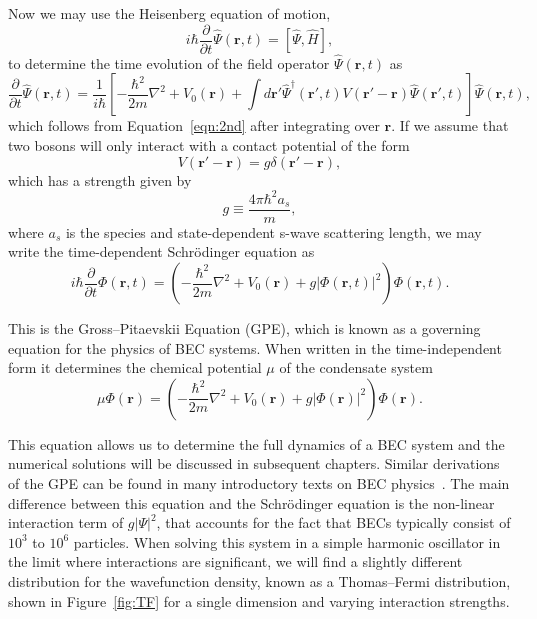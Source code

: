 Now we may use the Heisenberg equation of motion,
\begin{equation}
    i\hbar \frac{\partial}{\partial t}\hat \Psi(\mathbf{r},t) = [\hat \Psi, \hat H],
\end{equation}
    to determine the time evolution of the field operator $\hat \Psi(\mathbf{r},t)$ as
\begin{equation}
    \frac{\partial}{\partial t}\hat \Psi(\mathbf{r},t) = \frac{1}{i\hbar}\left[-\frac{\hbar^2}{2m}\nabla^2 + V_0(\mathbf{r}) + \int d\mathbf{r'} \hat \Psi^\dagger(\mathbf{r'}, t)V(\mathbf{r'} -\mathbf{r})\hat \Psi(\mathbf{r'},t)\right]\hat \Psi(\mathbf{r},t),
\end{equation}
which follows from Equation~\eqref{eqn:2nd} after integrating over $\mathbf{r}$.
If we assume that two bosons will only interact with a contact potential of the form
\begin{equation}
V(\mathbf{r'}-\mathbf{r}) = g\delta(\mathbf{r'} - \mathbf{r}),
\end{equation}
which has a strength given by
\begin{equation}
g \equiv \frac{4 \pi \hbar^2 a_s}{m},
\end{equation}
where $a_s$ is the species and state-dependent s-wave scattering length,
we may write the time-dependent Schr\"odinger equation as
\begin{equation}
    i\hbar \frac{\partial}{\partial t}\Phi(\mathbf{r},t) = \left( - \frac{\hbar^2}{2m} \nabla^2 + V_0(\mathbf{r}) + g |\Phi(\mathbf{r},t)|^2\right)\Phi(\mathbf{r},t).
\end{equation}

\noindent This is the Gross--Pitaevskii Equation (GPE), which is known as a governing equation for the physics of BEC systems.
When written in the time-independent form it determines the chemical potential $\mu$ of the condensate system~\cite{gross1961, pitaevskii1961}
\begin{equation}
    \mu\Phi(\mathbf{r}) = \left( - \frac{\hbar^2}{2m} \nabla^2 + V_0(\mathbf{r}) + g |\Phi(\mathbf{r})|^2\right)\Phi(\mathbf{r}).
    \label{eqn:GP}
\end{equation}

\noindent This equation allows us to determine the full dynamics of a BEC system and the numerical solutions will be discussed in subsequent chapters.
Similar derivations of the GPE can be found in many introductory texts on BEC physics~\cite{fetter2003, pethick2002, fetter2009}.
The main difference between this equation and the Schr\"odinger equation is the non-linear interaction term of $g|\Psi|^2$, that accounts for the fact that BECs typically consist of $10^3$ to $10^6$ particles.
When solving this system in a simple harmonic oscillator in the limit where interactions are significant, we will find a slightly different distribution for the wavefunction density, known as a Thomas--Fermi distribution, shown in Figure~\ref{fig:TF} for a single dimension and varying interaction strengths.

